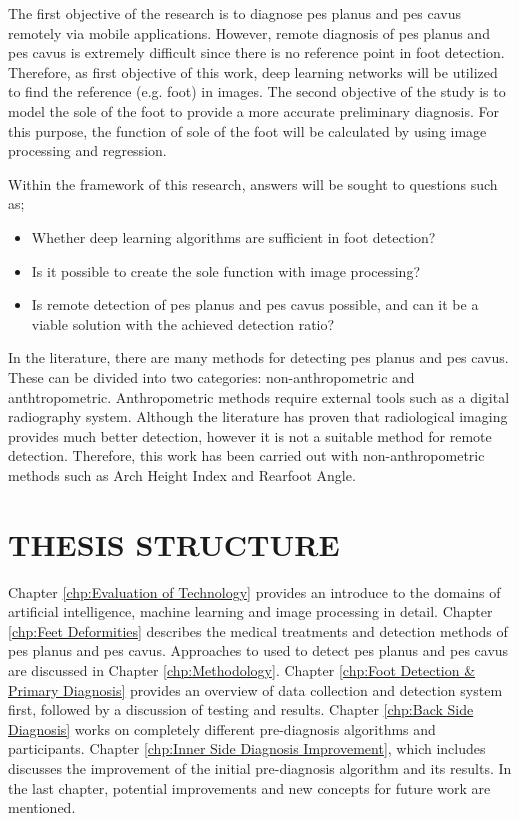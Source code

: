 The first objective of the research is to diagnose pes planus and pes cavus remotely via mobile applications. However, remote diagnosis of pes planus and pes cavus is extremely difficult since there is no reference point in foot detection. Therefore, as first objective of this work, deep learning networks will be utilized to find the reference (e.g. foot) in images. The second objective of the study is to model the sole of the foot to provide a more accurate preliminary diagnosis. For this purpose, the function of sole of the foot will be calculated by using image processing and regression.

Within the framework of this research, answers will be sought to questions such as;

\begin{itemize}
  \item Whether deep learning algorithms are sufficient in foot detection?
  \item Is it possible to create the sole function with image processing?
  \item Is remote detection of pes planus and pes cavus possible, and can it be a viable solution with the achieved detection ratio?
\end{itemize}

In the literature, there are many methods for detecting pes planus and pes cavus. These can be divided into two categories: non-anthropometric and anthtropometric. Anthropometric methods require external tools such as a digital radiography system. Although the literature has proven that radiological imaging provides much better detection, however it is not a suitable method for remote detection. Therefore, this work has been carried out with non-anthropometric methods such as Arch Height Index and Rearfoot Angle.

\section{THESIS STRUCTURE}

Chapter \ref{chp:Evaluation of Technology} provides an introduce to the domains of artificial intelligence, machine learning and image processing in detail. Chapter \ref{chp:Feet Deformities} describes the medical treatments and detection methods of pes planus and pes cavus. Approaches to used to detect pes planus and pes cavus are discussed in Chapter \ref{chp:Methodology}. Chapter \ref{chp:Foot Detection & Primary Diagnosis} provides an overview of data collection and detection system first, followed by a discussion of testing and results. Chapter \ref{chp:Back Side Diagnosis} works on completely different pre-diagnosis algorithms and participants. Chapter \ref{chp:Inner Side Diagnosis Improvement}, which includes discusses the improvement of the initial pre-diagnosis algorithm and its results. In the last chapter, potential improvements and new concepts for future work are mentioned.
